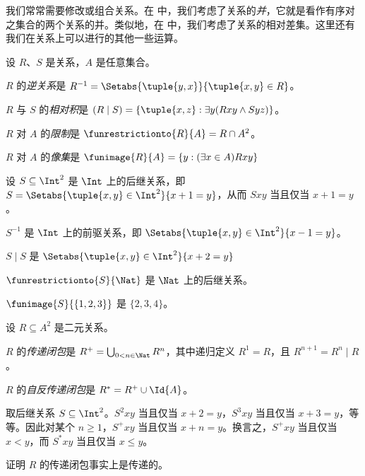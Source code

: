 \documentclass[../../../include/open-logic-section]{subfiles}
\begin{document}

我们常常需要修改或组合关系。在
 中，我们考虑了关系的\emph{并}，它就是看作有序对之集合的两个关系的并。类似地，在  中，我们考虑了关系的相对差集。这里还有我们在关系上可以进行的其他一些运算。

\begin{defn}
设 $R$、$S$ 是关系，$A$ 是任意集合。

$R$ 的\emph{逆关系}是 $R^{-1} = \Setabs{\tuple{y, x}}{\tuple{x,
    y} \in R}$。

$R$ 与 $S$ 的\emph{相对积}是 $(R \mid S) =
\{\tuple{x, z} : \exists y(Rxy \land Syz)\}$。

$R$ 对 $A$ 的\emph{限制}是 $\funrestrictionto{R}{A}= R
\cap A^2$。

$R$ 对 $A$ 的\emph{像集}是 $\funimage{R}{A} = \{y :
(\exists x \in A)Rxy\}$
\end{defn}

\begin{ex}
设 $S \subseteq \Int^2$ 是 $\Int$ 上的后继关系，即
$S = \Setabs{\tuple{x, y} \in \Int^2}{x + 1 = y}$，从而 $Sxy$ 当且仅当 $x + 1 = y$。

$S^{-1}$ 是 $\Int$ 上的前驱关系，即
$\Setabs{\tuple{x,y}\in\Int^2}{x -1 =y}$。

$S\mid S$ 是
$ \Setabs{\tuple{x,y}\in\Int^2}{x + 2 =y}$

$\funrestrictionto{S}{\Nat}$ 是 $\Nat$ 上的后继关系。

$\funimage{S}{\{1,2,3\}}$ 是 $\{2, 3, 4\}$。
\end{ex}

\begin{defn}[传递闭包]设 $R \subseteq A^2$ 是二元关系。

$R$ 的\emph{传递闭包}是 $R^+ = \bigcup_{0 < n \in
\Nat} R^n$，其中递归定义 $R^1 = R$，且 $R^{n+1} = R^n
\mid R$。

$R$ 的\emph{自反传递闭包}是 $R^* = R^+ \cup
\Id{A}$。
\end{defn}

\begin{ex}
取后继关系 $S \subseteq \Int^2$。$S^2xy$ 当且仅当 $x + 2 =
y$，$S^3xy$ 当且仅当 $x + 3 = y$，等等。因此对某个
$n \geq 1$，$S^+xy$ 当且仅当 $x + n = y$。换言之，$S^+xy$ 当且仅当 $x < y$，而 $S^*xy$ 当且仅当 $x \le
y$。
\end{ex}

\begin{prob}
证明 $R$ 的传递闭包事实上是传递的。
\end{prob}
\end{document}
